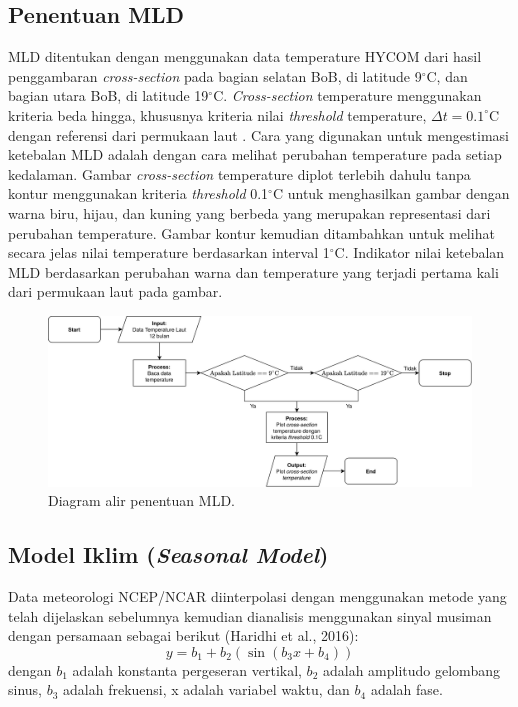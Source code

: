 \subsection[Penentuan MLD]{Penentuan MLD}
\begin{spacing}{1.5}
	MLD ditentukan dengan menggunakan data temperature HYCOM dari hasil penggambaran \textit{cross-section} pada bagian selatan BoB, di latitude 9$^\circ$C, dan bagian utara BoB, di latitude 19$^\circ$C. \textit{Cross-section} temperature menggunakan kriteria beda hingga, khususnya kriteria nilai \textit{threshold} temperature, $\Delta t=0.1^\circ$C dengan referensi dari permukaan laut . Cara yang digunakan untuk mengestimasi ketebalan MLD adalah dengan cara melihat perubahan temperature pada setiap kedalaman. Gambar \textit{cross-section} temperature diplot terlebih dahulu tanpa kontur menggunakan kriteria \textit{threshold} 0.1$^\circ$C untuk menghasilkan gambar dengan warna biru, hijau, dan kuning yang berbeda yang merupakan representasi dari perubahan temperature. Gambar kontur kemudian ditambahkan untuk melihat secara jelas nilai temperature berdasarkan interval 1$^\circ$C. Indikator nilai ketebalan MLD berdasarkan perubahan warna dan temperature yang terjadi pertama kali dari permukaan laut pada gambar.
	
	\begin{figure}[H]
		\centering
		\includegraphics[width=14cm]{contents/Flowchart_1.png}
		\caption{Diagram alir penentuan MLD.}
		\label{fig:flowchart_1}
	\end{figure}
\subsection[Model Iklim (\textit{Seasonal Model})]{Model Iklim (\textit{Seasonal Model})}
	Data meteorologi NCEP/NCAR diinterpolasi dengan menggunakan metode yang telah dijelaskan sebelumnya kemudian dianalisis menggunakan sinyal musiman dengan persamaan sebagai berikut (Haridhi et al., 2016):
	\begin{equation}\label{eq:nrl}
		y = b_1 + b_2(\sin(b_3x+b_4))
	\end{equation}
	dengan $b_1$ adalah konstanta pergeseran vertikal, $b_2$ adalah amplitudo gelombang sinus, $b_3$ adalah frekuensi, x adalah variabel waktu, dan $b_4$ adalah fase.
	

\end{spacing}
